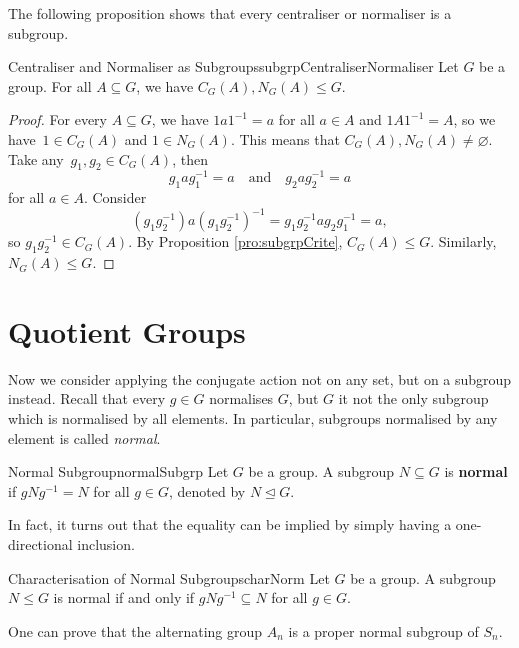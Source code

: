 \documentclass[math]{amznotes}
\theoremstyle{remark}
\newcommand{\0}{\mathbf{0}}
\newcommand{\1}{\mathbf{1}}
\begin{document}
The following proposition shows that every centraliser or normaliser is a subgroup.
\begin{probox}{Centraliser and Normaliser as Subgroups}{subgrpCentraliserNormaliser}
    Let $G$ be a group. For all $A \subseteq G$, we have $C_G\left(A\right), N_G\left(A\right) \leq G$.
    \tcblower
    \begin{proof}
        For every $A \subseteq G$, we have $1a1^{-1} = a$ for all $a \in A$ and $1A1^{-1} = A$, so we have~$1 \in C_G\left(A\right)$ and $1 \in N_G\left(A\right)$. This means that $C_G\left(A\right), N_G\left(A\right) \neq \varnothing$. Take any~$g_1, g_2 \in C_G\left(A\right)$, then 
        \begin{equation*}
            g_1ag_1^{-1} = a \quad\textrm{and}\quad g_2ag_2^{-1} = a
        \end{equation*}
        for all $a \in A$. Consider 
        \begin{equation*}
            \left(g_1g_2^{-1}\right)a\left(g_1g_2^{-1}\right)^{-1} = g_1g_2^{-1}ag_2g_1^{-1} = a,
        \end{equation*}
        so $g_1g_2^{-1} \in C_G\left(A\right)$. By Proposition \ref{pro:subgrpCrite}, $C_G\left(A\right) \leq G$. Similarly, $N_G\left(A\right) \leq G$.
    \end{proof}
\end{probox}
\section{Quotient Groups}
Now we consider applying the conjugate action not on any set, but on a subgroup instead. Recall that every $g \in G$ normalises $G$, but $G$ it not the only subgroup which is normalised by all elements. In particular, subgroups normalised by any element is called \textit{normal}.
\begin{dfnbox}{Normal Subgroup}{normalSubgrp}
    Let $G$ be a group. A subgroup $N \subseteq G$ is {\color{red} \textbf{normal}} if $gNg^{-1} = N$ for all $g \in G$, denoted by $N \trianglelefteq G$.
\end{dfnbox}
In fact, it turns out that the equality can be implied by simply having a one-directional inclusion.
\begin{probox}{Characterisation of Normal Subgroups}{charNorm}
    Let $G$ be a group. A subgroup $N \leq G$ is normal if and only if $gNg^{-1} \subseteq N$ for all $g \in G$.
\end{probox}
One can prove that the alternating group $A_n$ is a proper normal subgroup of $S_n$.
\end{document}
